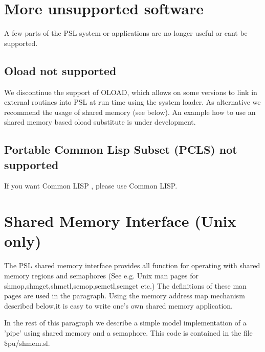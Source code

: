 \section{More unsupported software}

A few parts of the PSL system or applications are no longer useful
or cant be supported.

\subsection{Oload not supported}

We discontinue the support of OLOAD, which allows on some versions 
to link in external routines into PSL at run time using the system loader. 
As alternative we recommend the usage of shared memory (see below).
An example how to use an shared memory based oload substitute is under 
development.

\subsection{Portable Common Lisp Subset (PCLS) not supported}

If you want Common LISP , please use Common LISP.

\section{Shared Memory Interface (Unix only)}

The PSL shared memory interface provides all function for
operating with shared memory regions and semaphores
(See e.g. Unix man pages for shmop,shmget,shmctl,semop,semctl,semget etc.)
The definitions of these man pages are used in the paragraph.
Using the memory address map mechanism described below,it
is easy to write one's own shared memory application.

In the rest of this paragraph we describe a simple model
implementation of a 'pipe' using shared memory and a semaphore.
This code is contained in the file \$pu/shmem.sl.
\\



